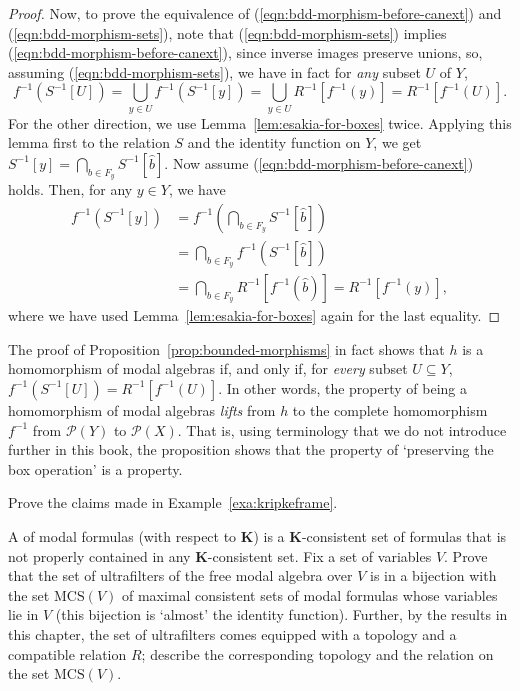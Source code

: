 \begin{proof}
Now, to prove the equivalence of (\ref{eqn:bdd-morphism-before-canext}) and (\ref{eqn:bdd-morphism-sets}), note that (\ref{eqn:bdd-morphism-sets}) implies (\ref{eqn:bdd-morphism-before-canext}), since inverse images preserve unions, so, assuming (\ref{eqn:bdd-morphism-sets}), we have in fact for \emph{any} subset $U$ of $Y$,
\[ f^{-1}(S^{-1}[U]) = \bigcup_{y \in U} f^{-1}(S^{-1}[y]) = \bigcup_{y \in U} R^{-1}[f^{-1}(y)] = R^{-1}[f^{-1}(U)].\]
For the other direction, we use Lemma~\ref{lem:esakia-for-boxes} twice. Applying this lemma first to the relation $S$ and the identity function on $Y$, we get $S^{-1}[y]  = \bigcap_{b \in F_y} S^{-1}[\widehat{b}]$. Now assume (\ref{eqn:bdd-morphism-before-canext}) holds. Then, for any $y \in Y$, we have
\begin{align*} 
  f^{-1}(S^{-1}[y]) &= f^{-1}\left(\bigcap_{b \in F_y} S^{-1}[\widehat{b}] \right)  \\
  &= \bigcap_{b \in F_y} f^{-1}(S^{-1}[\widehat{b}]) \\
  &= \bigcap_{b \in F_y} R^{-1}[f^{-1}(\widehat{b})] = R^{-1}[f^{-1}(y)],
\end{align*}
where we have used Lemma~\ref{lem:esakia-for-boxes} again for the last equality.
\end{proof}
\begin{remark}
  The proof of Proposition~\ref{prop:bounded-morphisms} in fact shows that $h$ is a homomorphism of modal algebras if, and only if, for \emph{every} subset $U \subseteq Y$, $f^{-1}(S^{-1}[U]) = R^{-1}[f^{-1}(U)]$. In other words, the property of being a homomorphism of modal algebras \emph{lifts} from $h$ to the complete homomorphism $f^{-1}$ from $\mathcal{P}(Y)$ to $\mathcal{P}(X)$. That is, using terminology that we do not introduce further in this book, the proposition shows that the property of `preserving the box operation' is a  property.
\end{remark}
\exercises
\begin{exercise}\label{exe:kripke-examples}
  Prove the claims made in Example~\ref{exa:kripkeframe}.
\end{exercise}
\begin{exercise}\label{exe:mcs}
  A  of modal formulas (with respect to $\mathbf{K}$) is a $\mathbf{K}$-consistent set of formulas that is not properly contained in any $\mathbf{K}$-consistent set. Fix a set of variables $V$. Prove that the set of ultrafilters of the free modal algebra over $V$ is in a bijection with the set $\mathrm{MCS}(V)$ of maximal consistent sets of modal formulas whose variables lie in $V$ (this bijection is `almost' the identity function). Further, by the results in this chapter, the set of ultrafilters comes equipped with a topology and a compatible relation $R$; describe the corresponding topology and the relation on the set $\mathrm{MCS}(V)$.
\end{exercise}
